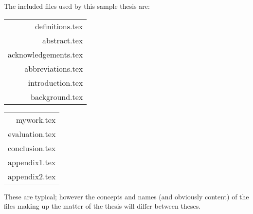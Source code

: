 The included files used by this sample thesis are:

\quad\begin{tabular}[t]{r}
definitions.tex \\
abstract.tex \\
acknowledgements.tex \\
abbreviations.tex \\
introduction.tex \\
background.tex
\end{tabular}
\quad\begin{tabular}[t]{r}
mywork.tex \\
evaluation.tex \\
conclusion.tex \\
appendix1.tex \\
appendix2.tex 
\end{tabular}

These are typical; however the concepts and names
(and obviously content) of the files making up the matter of the
thesis will differ between theses.
